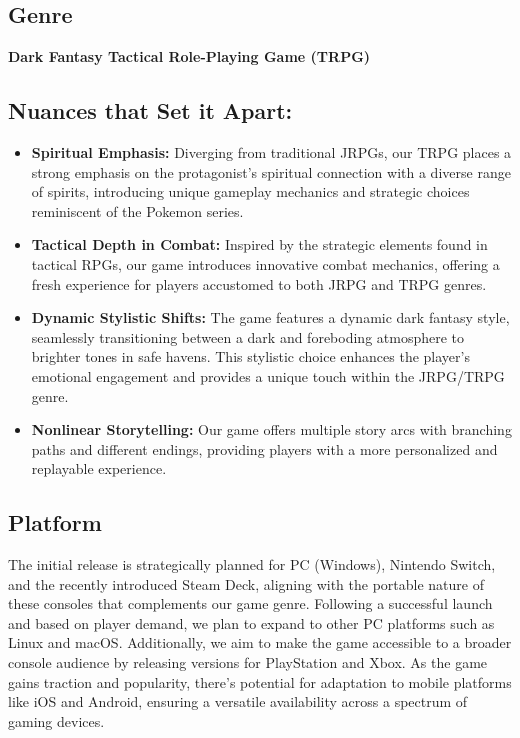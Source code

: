 \documentclass[a4paper,10pt,english]{article}
\begin{document}
\subsection*{Genre}
\textbf{Dark Fantasy Tactical Role-Playing Game (TRPG)}

\subsection*{Nuances that Set it Apart:}

\begin{itemize}
    \item \textbf{Spiritual Emphasis:} Diverging from traditional JRPGs, our TRPG places a strong emphasis on the protagonist's spiritual connection with a diverse range of spirits, introducing unique gameplay mechanics and strategic choices reminiscent of the Pokemon series.
  
    \item \textbf{Tactical Depth in Combat:} Inspired by the strategic elements found in tactical RPGs, our game introduces innovative combat mechanics, offering a fresh experience for players accustomed to both JRPG and TRPG genres.
  
    \item \textbf{Dynamic Stylistic Shifts:} The game features a dynamic dark fantasy style, seamlessly transitioning between a dark and foreboding atmosphere to brighter tones in safe havens. This stylistic choice enhances the player's emotional engagement and provides a unique touch within the JRPG/TRPG genre.
  
    \item \textbf{Nonlinear Storytelling:} Our game offers multiple story arcs with branching paths and different endings, providing players with a more personalized and replayable experience.
\end{itemize}

\subsection*{Platform}
The initial release is strategically planned for PC (Windows), Nintendo Switch, and the recently introduced Steam Deck, aligning with the portable nature of these consoles that complements our game genre. Following a successful launch and based on player demand, we plan to expand to other PC platforms such as Linux and macOS. Additionally, we aim to make the game accessible to a broader console audience by releasing versions for PlayStation and Xbox. As the game gains traction and popularity, there's potential for adaptation to mobile platforms like iOS and Android, ensuring a versatile availability across a spectrum of gaming devices.
\end{document}
